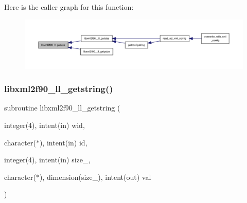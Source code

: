 Here is the caller graph for this function\+:
\nopagebreak
\begin{figure}[H]
\begin{center}
\leavevmode
\includegraphics[width=350pt]{libxml2f90_8f90__pp_8f90_acfe9271d1d35656ab0b7c9ab2d303476_icgraph}
\end{center}
\end{figure}
\mbox{\label{libxml2f90_8f90__pp_8f90_adbc34014dab0a252a634da0e15d1ae7d}} 
\subsubsection{\texorpdfstring{libxml2f90\+\_\+ll\+\_\+getstring()}{libxml2f90\_ll\_getstring()}}
{\footnotesize\ttfamily subroutine libxml2f90\+\_\+ll\+\_\+getstring (\begin{DoxyParamCaption}\item[{integer(4), intent(in)}]{wid,  }\item[{character($\ast$), intent(in)}]{id,  }\item[{integer(4), intent(in)}]{size\+\_\+,  }\item[{character($\ast$), dimension(size\+\_\+), intent(out)}]{val }\end{DoxyParamCaption})}

